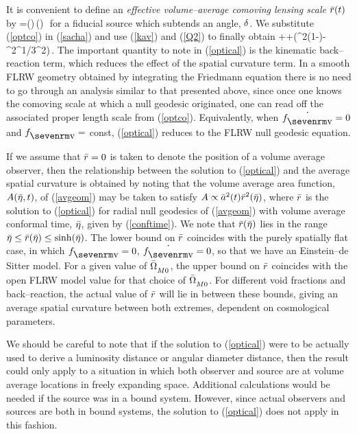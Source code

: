 \documentclass[12pt]{article}
\begin{document}
It is convenient to define an {\em effective volume--average comoving
lensing scale} $\rb(\ts)$ by
\beq
\ave{\dA}=\ab(\ts)\,\rb(\ts)\,\de\,
\label{optco}\eeq
for a fiducial source which subtends an angle, $\delta$. We substitute
(\ref{optco}) in (\ref{sacha}) and use (\ref{kav}) and (\ref{Q2}) to finally
obtain
\beq
\ddot\rb+{\dot\ab\over\ab}\dot\rb+\Bigl({\dot\fv^2\fv(1-\fv)}-
{\al^2\fv^{1/3}\over\ab^2}\Bigr)\,.
\label{optical}\eeq
The important quantity to note in (\ref{optical}) is the kinematic
back--reaction term, which reduces the effect of the spatial curvature
term. In a smooth FLRW geometry obtained by integrating
the Friedmann equation there is no need to go through an analysis
similar to that presented above, since once one knows the comoving
scale at which a null geodesic originated, one can read off the associated
proper length scale from (\ref{optco}). Equivalently, when $\dot\fv=0$ and
$\fv=$ const, (\ref{optical}) reduces to the FLRW null geodesic equation.

If we assume that $\rb=0$ is taken to denote the position of a volume average
observer, then the relationship between the solution to (\ref{optical}) and
the average spatial curvature is obtained by noting that the volume average
area function, $A(\etb,\ts)$, of (\ref{avgeom}) may be taken to satisfy
$A\propto\ab^2(\ts)\rb^2(\etb)$, where $\rb$ is the solution to (\ref{optical})
for radial null geodesics of (\ref{avgeom}) with volume average
conformal time, $\etb$, given by (\ref{conftime}). We note that $\rb(\etb)$
lies in the range $\etb\le\rb(\etb)\le\sinh(\etb)$. The lower bound on $\rb$
coincides with the purely spatially flat case, in which $\fv=0$,
$\dot\fv=0$, so that we have an Einstein--de Sitter model. For a given
value of $\OM\Z{M0}$, the upper bound on $\rb$ coincides with the
open FLRW model value for that choice of $\OM\Z{M0}$. For different void
fractions and back--reaction, the actual value of $\rb$ will lie
in between these bounds, giving an average spatial curvature between
both extremes, dependent on cosmological parameters.

We should be careful to note that if the solution to (\ref{optical})
were to be actually used to derive a luminosity distance or angular
diameter distance, then the result could only apply to a situation in which
both observer and source are at volume average locations in freely expanding
space. Additional calculations would be needed if the source was in a bound
system. However, since actual observers and sources are both in bound
systems, the solution to (\ref{optical}) does not apply in this fashion.
\end{document}
